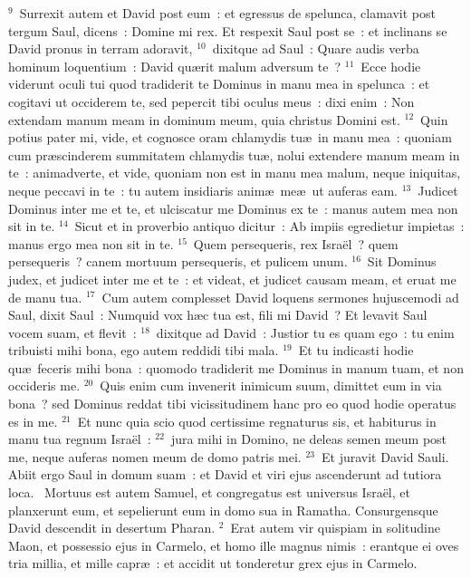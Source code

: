 ${}^{9}$~Surrexit autem et David post eum~: et egressus de spelunca, clamavit post tergum Saul, dicens~: Domine mi rex. Et respexit Saul post se~: et inclinans se David pronus in terram adoravit,
${}^{10}$~dixitque ad Saul~: Quare audis verba hominum loquentium~: David qu\ae rit malum adversum te~?
${}^{11}$~Ecce hodie viderunt oculi tui quod tradiderit te Dominus in manu mea in spelunca~: et cogitavi ut occiderem te, sed pepercit tibi oculus meus~: dixi enim~: Non extendam manum meam in dominum meum, quia christus Domini est.
${}^{12}$~Quin potius pater mi, vide, et cognosce oram chlamydis tu\ae\ in manu mea~: quoniam cum pr\ae scinderem summitatem chlamydis tu\ae , nolui extendere manum meam in te~: animadverte, et vide, quoniam non est in manu mea malum, neque iniquitas, neque peccavi in te~: tu autem insidiaris anim\ae\ me\ae\ ut auferas eam.
${}^{13}$~Judicet Dominus inter me et te, et ulciscatur me Dominus ex te~: manus autem mea non sit in te.
${}^{14}$~Sicut et in proverbio antiquo dicitur~: Ab impiis egredietur impietas~: manus ergo mea non sit in te.
${}^{15}$~Quem persequeris, rex Isra\"el~? quem persequeris~? canem mortuum persequeris, et pulicem unum.
${}^{16}$~Sit Dominus judex, et judicet inter me et te~: et videat, et judicet causam meam, et eruat me de manu tua.
${}^{17}$~Cum autem complesset David loquens sermones hujuscemodi ad Saul, dixit Saul~: Numquid vox h\ae c tua est, fili mi David~? Et levavit Saul vocem suam, et flevit~:
${}^{18}$~dixitque ad David~: Justior tu es quam ego~: tu enim tribuisti mihi bona, ego autem reddidi tibi mala.
${}^{19}$~Et tu indicasti hodie qu\ae\ feceris mihi bona~: quomodo tradiderit me Dominus in manum tuam, et non occideris me.
${}^{20}$~Quis enim cum invenerit inimicum suum, dimittet eum in via bona~? sed Dominus reddat tibi vicissitudinem hanc pro eo quod hodie operatus es in me.
${}^{21}$~Et nunc quia scio quod certissime regnaturus sis, et habiturus in manu tua regnum Isra\"el~:
${}^{22}$~jura mihi in Domino, ne deleas semen meum post me, neque auferas nomen meum de domo patris mei.
${}^{23}$~Et juravit David Sauli. Abiit ergo Saul in domum suam~: et David et viri ejus ascenderunt ad tutiora loca.
~Mortuus est autem Samuel, et congregatus est universus Isra\"el, et planxerunt eum, et sepelierunt eum in domo sua in Ramatha. Consurgensque David descendit in desertum Pharan.
${}^{2}$~Erat autem vir quispiam in solitudine Maon, et possessio ejus in Carmelo, et homo ille magnus nimis~: erantque ei oves tria millia, et mille capr\ae~: et accidit ut tonderetur grex ejus in Carmelo.
